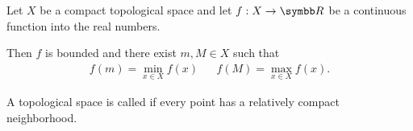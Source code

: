 \begin{theorem}\label{thm:weierstrass_extreme_value_theorem}\cite[corollary 3.2.9]{Engelking1989}
  Let \( X \) be a compact topological space and let \( f: X \to \BR \) be a continuous function into the real numbers.

  Then \( f \) is bounded and there exist \( m, M \in X \) such that
  \begin{align*}
    f(m) = \min_{x \in X} f(x)
    &&
    f(M) = \max_{x \in X} f(x).
  \end{align*}
\end{theorem}

\begin{definition}\label{def:locally_compact_space}\cite[148]{Engelking1989}
  A topological space is called  if every point has a relatively compact neighborhood.
\end{definition}
